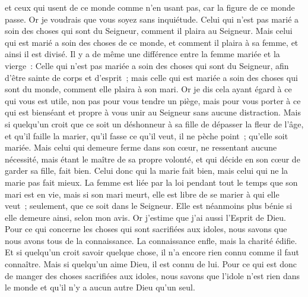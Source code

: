 \begin{multicols}{2}
et ceux qui usent de ce monde comme n'en usant pas, car la figure de ce monde passe.
Or je voudrais que vous soyez sans inquiétude. Celui qui n'est pas marié a soin des choses qui sont du Seigneur, comment il plaira au Seigneur.
Mais celui qui est marié a soin des choses de ce monde, et comment il plaira à sa femme, et ainsi il est divisé.
Il y a de même une différence entre la femme mariée et la vierge~: Celle qui n'est pas mariée a soin des choses qui sont du Seigneur, afin d'être sainte de corps et d'esprit~; mais celle qui est mariée a soin des choses qui sont du monde, comment elle plaira à son mari.
Or je dis cela ayant égard à ce qui vous est utile, non pas pour vous tendre un piège, mais pour vous porter à ce qui est bienséant et propre à vous unir au Seigneur sans aucune distraction.
Mais si quelqu'un croit que ce soit un déshonneur à sa fille de dépasser la fleur de l'âge, et qu'il faille la marier, qu'il fasse ce qu'il veut, il ne pèche point~; qu'elle soit mariée.
Mais celui qui demeure ferme dans son cœur, ne ressentant aucune nécessité, mais étant le maître de sa propre volonté, et qui décide en son cœur de garder sa fille, fait bien.
Celui donc qui la marie fait bien, mais celui qui ne la marie pas fait mieux.
La femme est liée par la loi pendant tout le temps que son mari est en vie, mais si son mari meurt, elle est libre de se marier à qui elle veut~; seulement, que ce soit dans le Seigneur.
Elle est néanmoins plus bénie si elle demeure ainsi, selon mon avis. Or j'estime que j'ai aussi l'Esprit de Dieu.
\VerseOne{}Pour ce qui concerne les choses qui sont sacrifiées aux idoles, nous savons que nous avons tous de la connaissance. La connaissance enfle, mais la charité édifie.
Et si quelqu'un croit savoir quelque chose, il n'a encore rien connu comme il faut connaître.
Mais si quelqu'un aime Dieu, il est connu de lui.
Pour ce qui est donc de manger des choses sacrifiées aux idoles, nous savons que l'idole n'est rien dans le monde et qu'il n'y a aucun autre Dieu qu'un seul.

\end{multicols}
